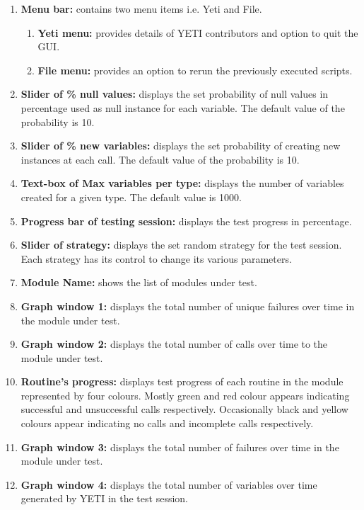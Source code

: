 \begin{enumerate}

\item \textbf{Menu bar:} contains two menu items i.e. Yeti and File.
\begin{enumerate}
\item \textbf{Yeti menu:} provides details of YETI contributors and option to quit the GUI.
\item \textbf{File menu:} provides an option to rerun the previously executed scripts.
\end{enumerate}
\item \textbf{Slider of \% null values:} displays the set probability of null values in percentage used as null instance for each variable. The default value of the probability is 10. 
\item \textbf{Slider of \% new variables:} displays the set probability of creating new instances at each call. The default value of the probability is 10. 
\item \textbf{Text-box of Max variables per type:} displays the number of variables created for a given type. The default value is 1000.
\item \textbf{Progress bar of testing session:} displays the test progress in percentage.
\item \textbf{Slider of strategy:} displays the set random strategy for the test session. Each strategy has its control to change its various parameters. 
\item \textbf{Module Name:} shows the list of modules under test. 
\item \textbf{Graph window 1:} displays the total number of unique failures over time in the module under test.
\item \textbf{Graph window 2:} displays the total number of calls over time to the module under test.
\item \textbf{Routine's progress:} displays test progress of each routine in the module represented by four colours. Mostly green and red colour appears indicating successful and unsuccessful calls respectively. Occasionally black and yellow colours appear indicating no calls and incomplete calls respectively.
\item \textbf{Graph window 3:} displays the total number of failures over time in the module under test. 
\item \textbf{Graph window 4:} displays the total number of variables over time generated by YETI in the test session.

\end{enumerate}
